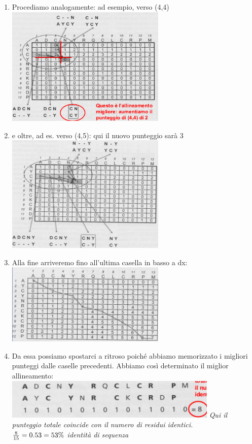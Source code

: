 \documentclass{article}
\begin{document}
\begin{enumerate}
    \item Procediamo analogamente: ad esempio, verso (4,4)\\
    \includegraphics[width=0.6\textwidth]{figures/quattro.png}
    \item e oltre, ad es. verso (4,5): qui il nuovo punteggio sarà 3\\
    \includegraphics[width=0.6\textwidth]{figures/cinque.png}
    \item Alla fine arriveremo fino all'ultima casella in basso a dx:\\
    \includegraphics[width=0.6\textwidth]{figures/sei.png}
    \item Da essa possiamo spostarci a ritroso poiché abbiamo
    memorizzato i migliori punteggi dalle caselle precedenti.
    Abbiamo così determinato il miglior allineamento:\\
    \includegraphics[width=0.8\textwidth]{figures/sette.png}
    \subitem \textit{Qui il punteggio totale coincide con il numero di residui
    identici.\\ ${8 \over 15} = 0.53 = 53\%$ identità di sequenza}
\end{enumerate}
\end{document}
